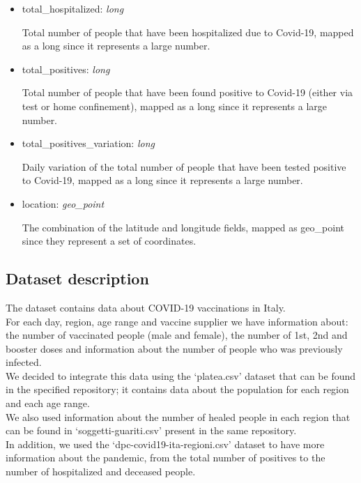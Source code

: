 \documentclass[12pt, a4paper]{article}
\begin{document}
\begin{itemize}
\begin{itemize}
\begin{footnotesize}
        \end{footnotesize}
      \item total\_hospitalized: \emph{long} \\
        \begin{footnotesize}
          Total number of people that have been hospitalized due to Covid-19, mapped as 
          a long since it represents a large number.
        \end{footnotesize}
      \item total\_positives: \emph{long} \\
        \begin{footnotesize}
          Total number of people that have been found positive to Covid-19 (either via 
          test or home confinement), mapped as a long since it represents a large number.
        \end{footnotesize} 
      \item total\_positives\_variation: \emph{long} \\
        \begin{footnotesize}
          Daily variation of the total number of people that have been tested positive 
          to Covid-19, mapped as a long since it represents a large number.
        \end{footnotesize}
      \item location: \emph{geo\_point} \\
        \begin{footnotesize}
          The combination of the latitude and longitude fields, mapped as geo\_point 
          since they represent a set of coordinates.
        \end{footnotesize}    
    \end{itemize}
\end{itemize}

\subsection{Dataset description}

The dataset contains data about COVID-19 vaccinations in Italy. \\
For each day, region, age range and vaccine supplier we have information about: the 
number of vaccinated people (male and female), the number of 1st, 2nd and booster doses
and information about the number of people who was previously infected. \\
We decided to integrate this data using the ‘platea.csv’ dataset that can be found 
in the specified repository; it contains data about the population for each region 
and each age range. \\ 
We also used information about the number of healed people in each region that can be 
found in ‘soggetti-guariti.csv’ present in the same repository. \\
In addition, we used the ‘dpc-covid19-ita-regioni.csv’ dataset to have more information 
about the pandemic, from the total number of positives to the number of hospitalized 
and deceased people.
\end{document}
